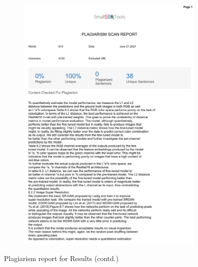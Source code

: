 \documentclass[oneside,a4paper,12pt]{report}
\begin{document}
\begin{appendices}
\begin{figure}
\begin{subfigure}[H]{\textwidth}
    	\includegraphics[scale=0.7, page=1]{plagiarism/results_2.pdf}
    \end{subfigure}
    \caption{Plagiarism report for Results (contd.)}
    \label{PlagiarismResults_2}
\end{figure}
\begin{figure}\ContinuedFloat
    \begin{subfigure}[H]{\textwidth}
    	\centering

\end{subfigure}
\end{figure}
\end{appendices}
\end{document}
